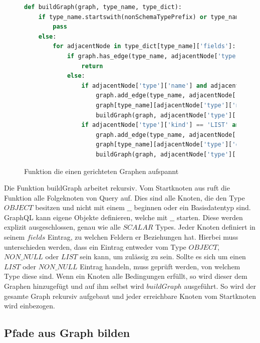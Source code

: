 \begin{figure}
    \begin{lstlisting}[language=Python]
def buildGraph(graph, type_name, type_dict):
    if type_name.startswith(nonSchemaTypePrefix) or type_name in baseDatatypes:
        pass
    else:
        for adjacentNode in type_dict[type_name]['fields']:
            if graph.has_edge(type_name, adjacentNode['type']['name']):
                return
            else:
                if adjacentNode['type']['name'] and adjacentNode['type']['name'] not in baseDatatypes:
                    graph.add_edge(type_name, adjacentNode['type']['name'])
                    graph[type_name][adjacentNode['type']['name']]["data"] = adjacentNode
                    buildGraph(graph, adjacentNode['type']['name'], type_dict)
                if adjacentNode['type']['kind'] == 'LIST' and adjacentNode['type']['ofType']['name'] not in baseDatatypes:
                    graph.add_edge(type_name, adjacentNode['type']['ofType']['name'])
                    graph[type_name][adjacentNode['type']['ofType']['name']]["data"] = adjacentNode
                    buildGraph(graph, adjacentNode['type']['ofType']['name'], type_dict)
    \end{lstlisting}
    \caption{Funktion die einen gerichteten Graphen aufspannt}
    \label{graphbuild}
\end{figure}

Die Funktion buildGraph arbeitet rekursiv.
Vom Startknoten aus ruft die Funktion alle Folgeknoten von Query auf.
Dies sind alle Knoten, die den Type $OBJECT$ besitzen und nicht mit einem $\_\_$ beginnen oder ein Basisdatentyp sind.
GraphQL kann eigene Objekte definieren, welche mit $\_\_$ starten.
Diese werden explizit ausgeschlossen, genau wie alle $SCALAR$ Types.
Jeder Knoten definiert in seinem $fields$ Eintrag, zu welchen Feldern er Beziehungen hat.
Hierbei muss unterschieden werden, dass ein Eintrag entweder vom Type $OBJECT$, $NON\_NULL$ oder $LIST$ sein kann, um zulässig zu sein.
Sollte es sich um einen $LIST$ oder $NON\_NULL$ Eintrag handeln, muss geprüft werden, von welchem Type diese sind.
Wenn ein Knoten alle Bedingungen erfüllt, so wird dieser dem Graphen hinzugefügt und auf ihm selbst wird $buildGraph$ ausgeführt.
So wird der gesamte Graph rekursiv aufgebaut und jeder erreichbare Knoten vom Startknoten wird einbezogen.

\newpage
\subsection{Pfade aus Graph bilden}

